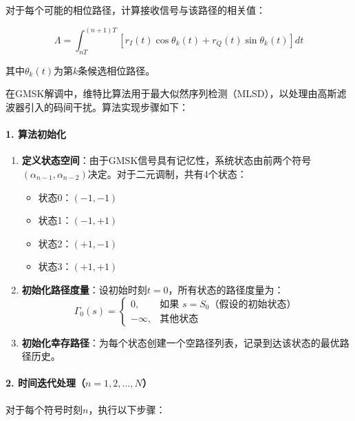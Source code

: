 \documentclass[12pt,a4paper,twoside]{article}
\numberwithin{equation}{section}
\begin{document}
对于每个可能的相位路径，计算接收信号与该路径的相关值：

\begin{equation}
    \Lambda = \int_{nT}^{(n+1)T} [r_I(t)\cos\theta_k(t) + r_Q(t)\sin\theta_k(t)] dt
\end{equation}

其中$\theta_k(t)$为第$k$条候选相位路径。

在GMSK解调中，维特比算法用于最大似然序列检测（MLSD），以处理由高斯滤波器引入的码间干扰。算法实现步骤如下：

\paragraph{1. 算法初始化}
\begin{enumerate}
    \item \textbf{定义状态空间}：由于GMSK信号具有记忆性，系统状态由前两个符号$(\alpha_{n-1}, \alpha_{n-2})$决定。对于二元调制，共有4个状态：
    \begin{itemize}
        \item 状态0：$(-1, -1)$
        \item 状态1：$(-1, +1)$
        \item 状态2：$(+1, -1)$
        \item 状态3：$(+1, +1)$
    \end{itemize}
    
    \item \textbf{初始化路径度量}：设初始时刻$t=0$，所有状态的路径度量为：
    \begin{equation}
        \Gamma_0(s) = 
        \begin{cases}
            0, & \text{如果 } s = S_0 \text{（假设的初始状态）} \\
            -\infty, & \text{其他状态}
        \end{cases}
    \end{equation}
    
    \item \textbf{初始化幸存路径}：为每个状态创建一个空路径列表，记录到达该状态的最优路径历史。
\end{enumerate}

\paragraph{2. 时间迭代处理（$n=1,2,\dots,N$）}

对于每个符号时刻$n$，执行以下步骤：
\end{document}
